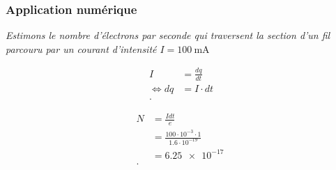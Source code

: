 \documentclass{article}
\begin{document}
\subsubsection{Application numérique}
\emph{Estimons le nombre d'électrons par seconde qui traversent la section d'un fil parcouru par un courant d'intensité $I = \SI{100}{\milli\ampere}$} 

\begin{align*}
	I &= \frac{dq}{dt} \\
	\iff dq &= I\cdot dt \\
.\end{align*}

\begin{align*}
	N &= \frac{Idt}{e} \\
	&= \frac{100\cdot 10^{-3}\cdot 1}{1.6\cdot 10^{-19}} \\
	&= \SI{6.25e-17}{} \\
.\end{align*}
\end{document}
